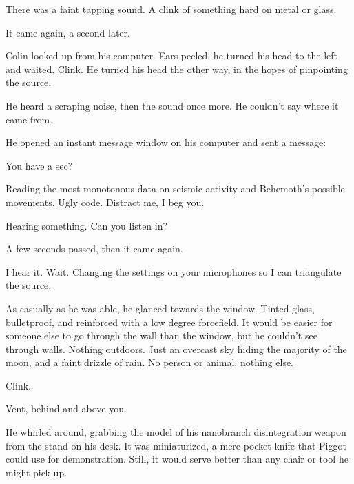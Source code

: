 





There was a faint tapping sound.  A clink of something hard on metal or glass.



It came again, a second later.



Colin looked up from his computer.  Ears peeled, he turned his head to the left and waited.  Clink.  He turned his head the other way, in the hopes of pinpointing the source.



He heard a scraping noise, then the sound once more.  He couldn't say where it came from.



He opened an instant message window on his computer and sent a message:



  You have a sec?



  Reading the most monotonous data on seismic activity and Behemoth's possible movements.  Ugly code.  Distract me, I beg you.



  Hearing something.  Can you listen in?



A few seconds passed, then it came again.



  I hear it.  Wait.  Changing the settings on your microphones so I can triangulate the source.



As casually as he was able, he glanced towards the window.  Tinted glass, bulletproof, and reinforced with a low degree forcefield.  It would be easier for someone else to go through the wall than the window, but he couldn't see through walls.  Nothing outdoors.  Just an overcast sky hiding the majority of the moon, and a faint drizzle of rain.  No person or animal, nothing else.



Clink.



  Vent, behind and above you.



He whirled around, grabbing the model of his nanobranch disintegration weapon from the stand on his desk.  It was miniaturized, a mere pocket knife that Piggot could use for demonstration.  Still, it would serve better than any chair or tool he might pick up.



